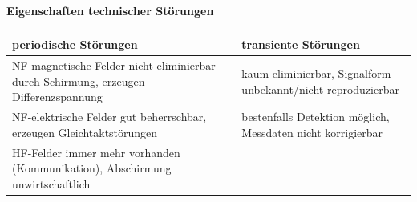 \documentclass[a4paper]{article}
\begin{document}
\begin{multicols}{3}

  \paragraph{Eigenschaften technischer Störungen}
  \begin{tabular}{p{4cm}|p{4cm}}
    periodische Störungen                                                                & transiente Störungen                                         \\\hline
    NF-magnetische Felder nicht eliminierbar durch Schirmung, erzeugen Differenzspannung & kaum eliminierbar, Signalform unbekannt/nicht reproduzierbar \\\hline
    NF-elektrische Felder gut beherrschbar, erzeugen Gleichtaktstörungen                 & bestenfalls Detektion möglich, Messdaten nicht korrigierbar  \\\hline
    HF-Felder immer mehr vorhanden (Kommunikation), Abschirmung unwirtschaftlich         &                                                              \\
  \end{tabular}



\end{multicols}
\end{document}
